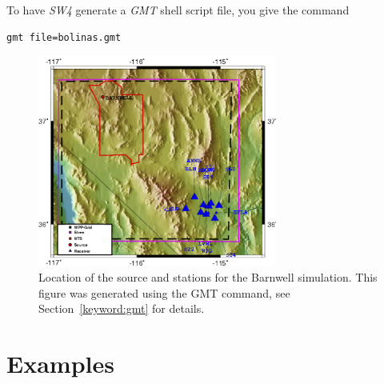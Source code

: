 \documentclass[11pt]{report}
\begin{document}
To have \emph{SW4} generate a \emph{GMT} shell script file, you give the command
\begin{verbatim}
gmt file=bolinas.gmt
\end{verbatim}
%
\begin{figure}
\begin{center}
\includegraphics[width=0.7\textwidth]{topography-gmt-small.png} 
\caption{Location of the source and stations for the Barnwell simulation. This figure was
  generated using the GMT command, see Section~\protect\ref{keyword:gmt} for details.}
\label{fig:topography-gmt}
\end{center}
\end{figure}
%

\chapter{Examples} \label{sec:examples}
\end{document}

